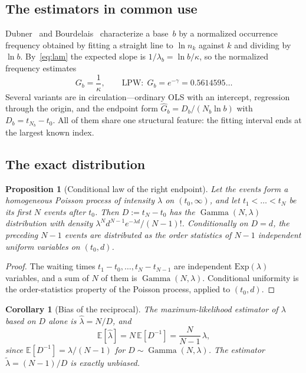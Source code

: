 \documentclass[11pt,a4paper]{article}
\theoremstyle{plain}
\newtheorem{proposition}{Proposition}
\newtheorem{corollary}{Corollary}
\theoremstyle{remark}
\newcommand{\emg}{e^{-\gamma}}
\DeclareMathOperator{\Gam}{Gamma}
\begin{document}
\subsection{The estimators in common use}
Dubner~\cite{dubner1993} and Bourdelais~\cite{bourdelais2009} characterize a
base~$b$ by a normalized occurrence frequency obtained by fitting a straight
line to $\ln n_k$ against $k$ and dividing by $\ln b$. By~\eqref{eq:lam} the
expected slope is $1/\lambda_b=\ln b/\kappa$, so the normalized frequency
estimates
\begin{equation}\label{eq:G}
G_b=\frac{1}{\kappa},\qquad\text{LPW:}\ \ G_b=\emg=0.5614595\ldots
\end{equation}
Several variants are in circulation---ordinary OLS with an intercept, regression
through the origin, and the endpoint form $\hat G_b=D_b/(N_b\ln b)$ with
$D_b=t_{N_b}-t_0$. All of them share one structural feature: the fitting
interval ends at the largest known index.

\subsection{The exact distribution}

\begin{proposition}[Conditional law of the right endpoint]\label{prop:gamma}
Let the events form a homogeneous Poisson process of intensity $\lambda$ on
$(t_0,\infty)$, and let $t_1<\dots<t_N$ be its first $N$ events after $t_0$.
Then $D:=t_N-t_0$ has the $\Gam(N,\lambda)$ distribution with density
$\lambda^{N}d^{N-1}e^{-\lambda d}/(N-1)!$. Conditionally on $D=d$, the preceding
$N-1$ events are distributed as the order statistics of $N-1$ independent
uniform variables on $(t_0,d)$.
\end{proposition}

\begin{proof}
The waiting times $t_1-t_0,\dots,t_N-t_{N-1}$ are independent
$\mathrm{Exp}(\lambda)$ variables, and a sum of $N$ of them is
$\Gam(N,\lambda)$. Conditional uniformity is the order-statistics property of
the Poisson process, applied to $(t_0,d)$.
\end{proof}

\begin{corollary}[Bias of the reciprocal]\label{cor:kappa}
The maximum-likelihood estimator of $\lambda$ based on $D$ alone is
$\hat\lambda=N/D$, and
\begin{equation}\label{eq:bias}
\mathbb E[\hat\lambda]=N\,\mathbb E[D^{-1}]=\frac{N}{N-1}\,\lambda,
\end{equation}
since $\mathbb E[D^{-1}]=\lambda/(N-1)$ for $D\sim\Gam(N,\lambda)$. The
estimator $\tilde\lambda=(N-1)/D$ is exactly unbiased.
\end{corollary}
\end{document}
